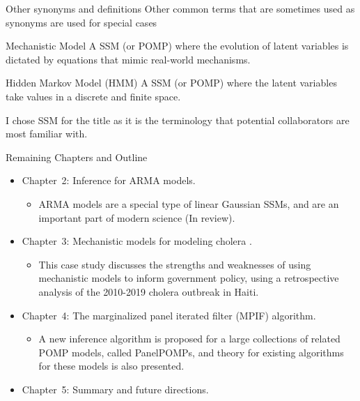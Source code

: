 \documentclass[aspectratio=169]{beamer}\usepackage[]{graphicx}\usepackage[]{xcolor}
\begin{document}
\begin{frame}{Other synonyms and definitions}
  Other common terms that are sometimes used as synonyms are used for special cases 
  \begin{block}{Mechanistic Model}
    A SSM (or POMP) where the evolution of latent variables is dictated by equations that mimic real-world mechanisms. 
  \end{block}
  
  \begin{block}{Hidden Markov Model (HMM)}
    A SSM (or POMP) where the latent variables take values in a discrete and finite space.
  \end{block}

I chose SSM for the title as it is the terminology that potential collaborators are most familiar with.

\end{frame}

\begin{frame}{Remaining Chapters and Outline}
  \begin{itemize}
    \item \alert{Chapter~2:} Inference for $\mathrm{ARMA}$ models.
      \begin{itemize}
        \item $\mathrm{ARMA}$ models are a special type of linear Gaussian SSMs, and are an important part of modern science (In review). 
      \end{itemize}
    \item \alert{Chapter~3:} Mechanistic models for modeling cholera \citep{wheeler24}.
      \begin{itemize}
        \item This case study discusses the strengths and weaknesses of using mechanistic models to inform government policy, using a retrospective analysis of the 2010-2019 cholera outbreak in Haiti.
      \end{itemize}
    \item \alert{Chapter~4:} The marginalized panel iterated filter (MPIF) algorithm.
    \begin{itemize}
      \item A new inference algorithm is proposed for a large collections of related POMP models, called PanelPOMPs, and theory for existing algorithms for these models is also presented.
    \end{itemize}
    \item \alert{Chapter~5:} Summary and future directions.
  \end{itemize}
\end{frame}
\end{document}

